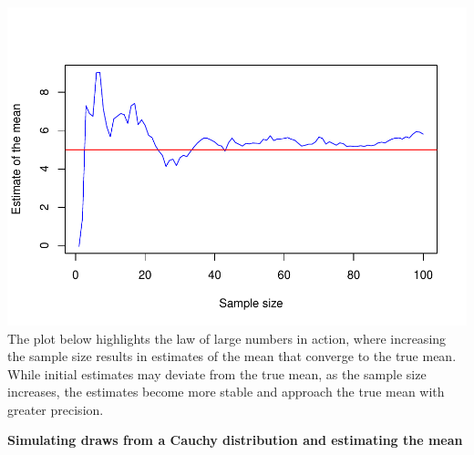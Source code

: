 \documentclass{article}
\begin{document}
\includegraphics{Figures and Plots/figure-latex/global_options2-1.pdf}
The plot below highlights the law of large numbers in action, where increasing
the sample size results in estimates of the mean that converge to the
true mean. While initial estimates may deviate from the true mean, as
the sample size increases, the estimates become more stable and approach
the true mean with greater precision.


\begin{center}
\textbf{Simulating draws from a Cauchy distribution and estimating the mean} 
\end{center}

\vspace{2em}
\end{document}

